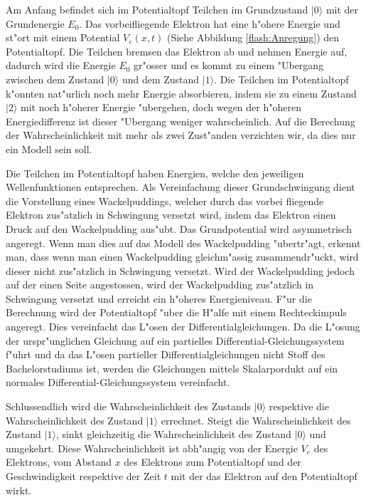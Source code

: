 \begin{refsection}
Am Anfang befindet sich im Potentialtopf Teilchen im Grundzustand $|0\rangle$
mit der Grundenergie $E_{0}$.
Das vorbeifliegende Elektron hat eine h"ohere Energie und st"ort mit
einem Potential $V_{e}(x,t)$ (Siehe Abbildung \ref{flash:Anregung})
den Potentialtopf.
Die Teilchen bremsen das Elektron ab und nehmen Energie auf, dadurch
wird die Energie $E_{0}$ gr"osser und es kommt zu einem "Ubergang 
zwischen dem Zustand $|0\rangle$ und dem Zustand $|1\rangle$.
Die Teilchen im Potentialtopf k"onnten nat"urlich noch mehr Energie
absorbieren, indem sie zu einem Zustand $|2\rangle$ mit noch h"oherer
Energie "ubergehen, doch wegen der h"oheren Energiedifferenz ist dieser
"Ubergang weniger wahrscheinlich.
Auf die Berechung der Wahrscheinlichkeit mit mehr als zwei Zust"anden
verzichten wir, da dies nur ein Modell sein soll.

Die Teilchen im Potentialtopf haben Energien, welche den jeweiligen 
Wellenfunktionen entsprechen.
Als Vereinfachung dieser Grundschwingung dient die Vorstellung eines
Wackelpuddings, welcher durch das vorbei fliegende Elektron zus"atzlich
in Schwingung versetzt wird, indem das Elektron einen Druck auf den
Wackelpudding aus"ubt.
Das Grundpotential wird asymmetrisch angeregt.
Wenn man dies auf das Modell des Wackelpudding "ubertr"agt, erkennt man,
dass wenn man einen Wackelpudding gleichm"assig zusammendr"uckt, wird
dieser nicht zus"atzlich in Schwingung versetzt.
Wird der Wackelpudding jedoch auf der einen Seite angestossen, wird der
Wackelpudding zus"atzlich in Schwingung versetzt und erreicht ein
h"oheres Energieniveau.
F"ur die Berechnung wird der Potentialtopf "uber die H"alfe mit einem
Rechteckimpuls angeregt.
Dies vereinfacht das L"osen der Differentialgleichungen.
Da die L"osung der urspr"unglichen Gleichung auf ein partielles
Differential-Gleichungssystem f"uhrt und da das L"osen partieller
Differentialgleichungen nicht Stoff des Bachelorstudiums ist, werden
die Gleichungen mittels Skalarpordukt auf ein normales
Differential-Gleichungssystem vereinfacht.

Schlussendlich wird die Wahrscheinlichkeit des Zustands $|0\rangle$ 
respektive die Wahrscheinlichkeit des Zustand $|1\rangle$ errechnet.
Steigt die Wahrscheinlichkeit des Zustand $|1\rangle$, sinkt gleichzeitig
die Wahrscheinlichkeit des Zustand $|0\rangle$ und umgekehrt.
Diese Wahrscheinlichkeit ist abh"angig von der Energie $V_{e}$ 
des Elektrons, vom Abstand $x$ des Elektrons zum Potentialtopf und der 
Geschwindigkeit respektive der Zeit $t$ mit der das Elektron auf den 
Potentialtopf wirkt.


\end{refsection}
